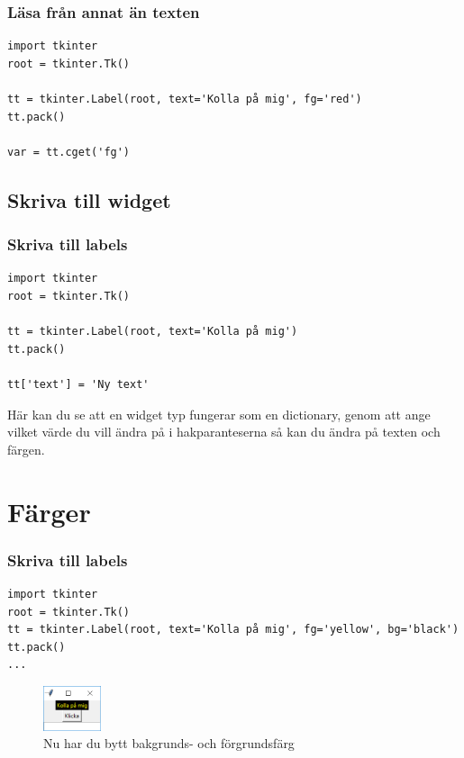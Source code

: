 \documentclass[aspectratio=169]{beamer}
\begin{document}
\begin{frame}[fragile]
\frametitle{Läsa från annat än texten}

\begin{lstlisting}
import tkinter
root = tkinter.Tk()

tt = tkinter.Label(root, text='Kolla på mig', fg='red')
tt.pack()

var = tt.cget('fg')
\end{lstlisting}

\end{frame}

\subsection{Skriva till widget}

\begin{frame}[fragile]
\frametitle{Skriva till labels}

\begin{lstlisting}
import tkinter
root = tkinter.Tk()

tt = tkinter.Label(root, text='Kolla på mig')
tt.pack()

tt['text'] = 'Ny text'
\end{lstlisting}

Här kan du se att en widget typ fungerar som en dictionary, genom att ange vilket värde du vill ändra på i hakparanteserna så kan du ändra på texten och färgen.

\end{frame}

\section{Färger}

\begin{frame}[fragile]
\frametitle{Skriva till labels}

\begin{lstlisting}
import tkinter
root = tkinter.Tk()
tt = tkinter.Label(root, text='Kolla på mig', fg='yellow', bg='black')
tt.pack()
...
\end{lstlisting}

\begin{figure}
	\begin{center}
		\includegraphics[width=0.15\textwidth]{win5.png}
		\caption{Nu har du bytt bakgrunds- och förgrundsfärg}
	\end{center}
\end{figure}

\end{frame}
\end{document}
